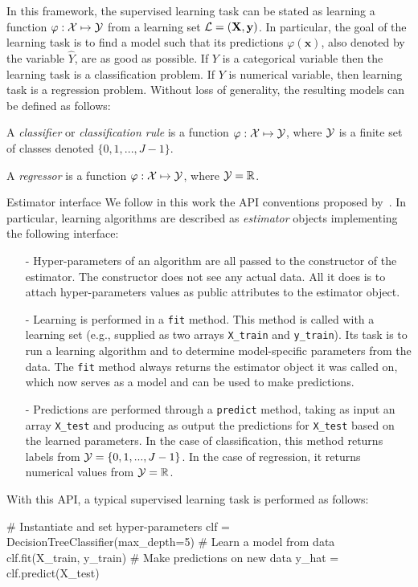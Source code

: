 In this framework, the supervised learning task can be stated as learning a
function $\varphi: {\cal X} \mapsto {\cal Y}$ from a learning set ${\cal
L}=(\mathbf{X}, \mathbf{y})$. In particular, the goal of the learning task is
to find a model such that its predictions $\varphi(\mathbf{x})$, also denoted
by the variable $\hat{Y}$, are as good as possible. If $Y$ is a categorical
variable then the learning task is a classification problem. If $Y$ is
numerical variable, then learning task is a regression problem. Without loss of
generality, the resulting models can be defined as
follows:

\begin{definition}
A \emph{classifier} or \emph{classification rule} is a function $\varphi: {\cal X}
\mapsto {\cal Y}$, where ${\cal Y}$ is a finite set of classes denoted $\{0, 1, ..., J-1\}$.
\end{definition}

\begin{definition}
A \emph{regressor} is a function $\varphi: {\cal X} \mapsto {\cal Y}$, where ${\cal Y}=\mathbb{R}$.
\end{definition}

\begin{remark}{Estimator interface}
We follow in this work the API conventions proposed by~\citet{buitinck:2013}.
In particular, learning algorithms are described as \textit{estimator} objects implementing the
following interface:

\begin{itemize}
\item[-] Hyper-parameters of an algorithm are all passed to the constructor of the
estimator. The constructor does not see any actual data. All it does
is to attach hyper-parameters values as public attributes to the estimator object.
\item[-] Learning is performed in a \texttt{fit} method. This method is called with
a learning set (e.g., supplied as two arrays \texttt{X\_train} and \texttt{y\_train}). Its
task is to run a learning algorithm and to determine model-specific parameters
from the data. The \texttt{fit} method always returns the estimator object
it was called on, which now serves as a model and can be used to make predictions.
\item[-] Predictions are performed through a \texttt{predict} method, taking
as input an array \texttt{X\_test} and producing as output the predictions for
\texttt{X\_test} based on the learned parameters. In the case of classification,
this method returns labels from ${\cal Y} = \{0, 1, ..., J-1\}$. In the case of regression,
it returns numerical values from ${\cal Y} = \mathbb{R}$.
\end{itemize}

With this API, a typical supervised learning task is performed as follows:

\vskip0.3cm
\begin{pythoncode}
# Instantiate and set hyper-parameters
clf = DecisionTreeClassifier(max_depth=5)
# Learn a model from data
clf.fit(X_train, y_train)
# Make predictions on new data
y_hat = clf.predict(X_test)
\end{pythoncode}
\end{remark}


